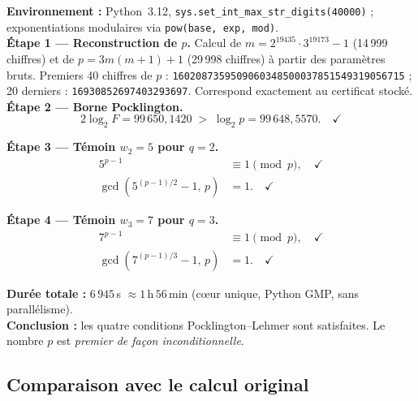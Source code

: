 \begin{rigorousbox}[title={\textbf{Attestation de vérification} — calcul indépendant}]
\textbf{Environnement :} Python~3.12,
\texttt{sys.set\_int\_max\_str\_digits(40000)} ;
exponentiations modulaires via \texttt{pow(base, exp, mod)}.\\[4pt]

\textbf{Étape 1 — Reconstruction de $p$.}\quad
Calcul de $m = 2^{19435}\cdot 3^{19173}-1$ (14\,999 chiffres) et de
$p = 3m(m+1)+1$ (29\,998 chiffres) à partir des paramètres bruts.
Premiers 40 chiffres de $p$ :
\texttt{1602087359509060348500037851549319056715} ;
20 derniers : \texttt{16930852697403293697}.
Correspond exactement au certificat stocké.\\[4pt]

\textbf{Étape 2 — Borne Pocklington.}
\[
  2\log_2 F = 99\,650{,}1420 \;>\; \log_2 p = 99\,648{,}5570.\quad\checkmark
\]

\textbf{Étape 3 — Témoin $w_2 = 5$ pour $q = 2$.}
\begin{align*}
  5^{p-1} &\equiv 1 \pmod{p},\quad\checkmark \\
  \gcd(5^{(p-1)/2}-1,\,p) &= 1.\quad\checkmark
\end{align*}

\textbf{Étape 4 — Témoin $w_3 = 7$ pour $q = 3$.}
\begin{align*}
  7^{p-1} &\equiv 1 \pmod{p},\quad\checkmark \\
  \gcd(7^{(p-1)/3}-1,\,p) &= 1.\quad\checkmark
\end{align*}

\textbf{Durée totale :} $6\,945$\,s $\approx 1$\,h\,$56$\,min
(cœur unique, Python GMP, sans parallélisme).\\[4pt]

\textbf{Conclusion :} les quatre conditions Pocklington–Lehmer sont satisfaites.
Le nombre $p$ est \emph{premier de façon inconditionnelle}.
\end{rigorousbox}

\subsection{Comparaison avec le calcul original}

